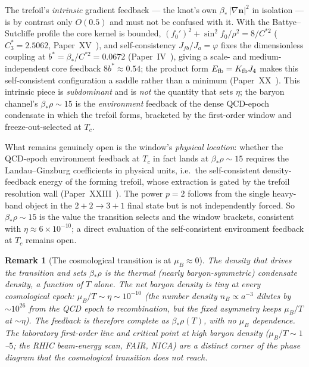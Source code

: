 \documentclass[11pt,a4paper]{article}
\newtheorem{remark}[theorem]{Remark}
\theoremstyle{definition}\newtheorem{definition}[theorem]{Definition}
\newcommand{\vp}{\varphi}
\begin{document}
The trefoil's \emph{intrinsic} gradient feedback --- the knot's own
$\beta_*\,|\nabla\mathbf{n}|^2$ in isolation --- is by contrast only $O(0.5)$ and must not be
confused with it. With the Battye--Sutcliffe profile the core kernel is bounded,
$(f_0')^2+\sin^2\!f_0/\rho^2=8/C^{\ast2}$ ($C_3^\ast=2.5062$, Paper~XV~\cite{Paper15}), and
self-consistency $J_{fb}/J_a=\vp$ fixes the dimensionless coupling at
$b^\ast=\beta_*/C^{\ast2}=0.0672$ (Paper~IV~\cite{Paper4}), giving a scale- and medium-independent
core feedback $8b^\ast\approx0.54$; the product form $E_{\rm fb}=K_{\rm fb}J_4$ makes this
self-consistent configuration a saddle rather than a minimum (Paper~XX~\cite{Paper20}). This
intrinsic piece is \emph{subdominant} and is \emph{not} the quantity that sets $\eta$; the baryon
channel's $\beta_*\rho\sim15$ is the \emph{environment} feedback of the dense QCD-epoch condensate
in which the trefoil forms, bracketed by the first-order window and freeze-out-selected at $T_c$.

What remains genuinely open is the window's \emph{physical location}: whether the QCD-epoch
environment feedback at $T_c$ in fact lands at $\beta_*\rho\sim15$ requires the Landau--Ginzburg
coefficients in physical units, i.e.\ the self-consistent density-feedback energy of the forming
trefoil, whose extraction is gated by the trefoil resolution wall (Paper~XXIII~\cite{Paper23}). The
power $p=2$ follows from the single heavy-band object in the $2+2\to3+1$ final state but is not
independently forced. So $\beta_*\rho\sim15$ is the value the transition selects and the window
brackets, consistent with $\eta\approx6\times10^{-10}$; a direct evaluation of the self-consistent
environment feedback at $T_c$ remains open.

\begin{remark}[The cosmological transition is at $\mu_B\approx0$]
\label{P22:rem:muB}
The density that drives the transition and sets $\beta_*\rho$ is the \emph{thermal} (nearly
baryon-symmetric) condensate density, a function of $T$ alone. The net baryon density is tiny at
every cosmological epoch: $\mu_B/T\sim\eta\sim10^{-10}$ (the number density $n_B\propto a^{-3}$
dilutes by $\sim10^{26}$ from the QCD epoch to recombination, but the fixed asymmetry keeps
$\mu_B/T$ at $\sim\eta$). The feedback is therefore complete as $\beta_*\rho(T)$, with no $\mu_B$
dependence. The laboratory first-order line and critical point at high baryon density
($\mu_B/T\sim1$--$5$; the RHIC beam-energy scan, FAIR, NICA) are a distinct corner of the phase
diagram that the cosmological transition does not reach.
\end{remark}
\end{document}
